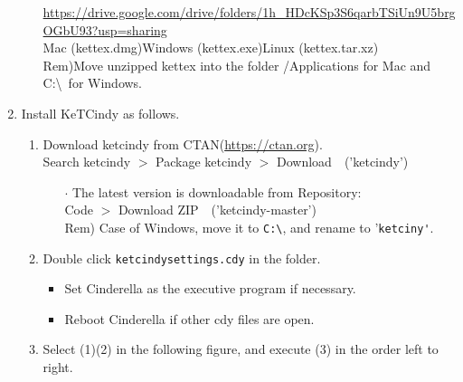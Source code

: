 \documentclass{article}
\begin{document}
\begin{enumerate}[\bf\large 1.]
\begin{enumerate}[(1)]
\hspace*{3mm}\url{https://drive.google.com/drive/folders/1h_HDcKSp3S6qarbTSiUn9U5brgOGbU93?usp=sharing}\\
\hspace*{12mm}Mac (kettex.dmg)\hspace{3mm}Windows (kettex.exe)\hspace*{3mm}Linux (kettex.tar.xz)\\
\hspace*{3mm}Rem)Move unzipped kettex into the folder /Applications for Mac and C:\textbackslash\ for Windows.
 \end{enumerate}

\item Install KeTCindy as follows.\vspace{-1mm}
  \begin{enumerate}[(1)]
  \item Download ketcindy from CTAN(\url{https://ctan.org}).\\
  \hspace*{10mm}Search ketcindy $>$ Pack­age ketcindy $>$ Download\ \ ('ketcindy')\vspace{-1mm}
    \begin{itemize}
    \item[$\cdot$]The {\color{red}latest version} is downloadable from Repository:\\
         \hspace*{10mm}Code $>$ Download ZIP\ \ ('ketcindy-master')\\
        \hspace*{5mm}Rem) Case of Windows, move it to \verb|C:\|, and rename to '\verb|ketciny'|.\vspace{-1mm}
    \end{itemize}
  \item Double click \verb|ketcindysettings.cdy| in the folder.\vspace{-1mm}
    \begin{itemize}
    \item Set Cinderella as the executive program if necessary.\vspace{-1mm}
    \item Reboot Cinderella if other cdy files are open.\vspace{-1mm}
   \end{itemize}
  \item Select (1)(2) in the following figure, and execute (3) in the order left to right.
  \end{enumerate}


\end{enumerate}
\end{document}
